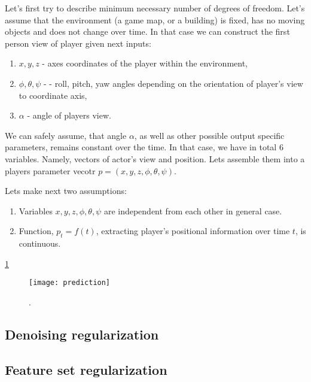 Let's first try to describe minimum necessary number of degrees of freedom.
Let's assume that the environment (a game map, or a building) is fixed, has no moving objects and does not change over time.
In that case we can construct the first person view of player given next inputs:
\begin{enumerate}
  \item $x, y, z$ - axes coordinates of the player within the environment,
  \item $\phi, \theta, \psi$ -  - roll, pitch, yaw angles depending on the orientation of player's view to coordinate axis,
  \item $\alpha$ - angle of players view.
\end{enumerate}

We can safely assume, that angle $\alpha$, as well as other possible output specific parameters, remains constant over the time.
In that case, we have in total 6 variables.
Namely, vectors of actor's view and position.
Lets assemble them into a players parameter vecotr $p=(x, y, z, \phi, \theta, \psi)$.

Lets make next two assumptions:
\begin{enumerate}
  \item Variables $x, y, z, \phi, \theta, \psi$ are independent from each other in general case.
  \item Function, $p_t=f(t)$, extracting player's positional information over time $t$, is continuous.
\end{enumerate}


\ref{fig:m_pred}

\begin{figure}[h!]
  \centering
    \texttt{[image: prediction]}
  \caption{.}
  \label{fig:m_pred}
\end{figure}


\subsection{Denoising regularization}
\subsection{Feature set regularization}
